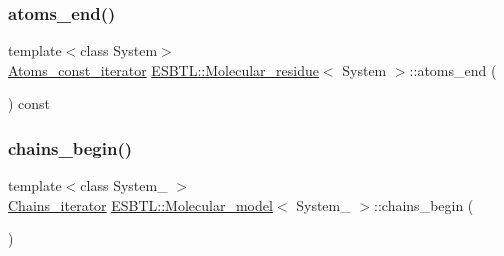 \mbox{\label{group__grp__iters_ga27d17ddd3a3c208e95464afb2e466459}} 
\subsubsection{\texorpdfstring{atoms\+\_\+end()}{atoms\_end()}\hspace{0.1cm}{\footnotesize\ttfamily [8/8]}}
{\footnotesize\ttfamily template$<$class System$>$ \\
\hyperlink{group__grp__iters_gab312d7a420670665b99a379b51825c9c}{Atoms\+\_\+const\+\_\+iterator} \hyperlink{classESBTL_1_1Molecular__residue}{E\+S\+B\+T\+L\+::\+Molecular\+\_\+residue}$<$ System $>$\+::atoms\+\_\+end (\begin{DoxyParamCaption}{ }\end{DoxyParamCaption}) const\hspace{0.3cm}{\ttfamily [inline]}}

\mbox{\label{group__grp__iters_gaab272442c99d33d2f421a632fcee1569}} 
\subsubsection{\texorpdfstring{chains\+\_\+begin()}{chains\_begin()}\hspace{0.1cm}{\footnotesize\ttfamily [1/2]}}
{\footnotesize\ttfamily template$<$class System\+\_\+ $>$ \\
\hyperlink{group__grp__iters_ga763cc293a5df9ae7dd6e31c198dce24b}{Chains\+\_\+iterator} \hyperlink{classESBTL_1_1Molecular__model}{E\+S\+B\+T\+L\+::\+Molecular\+\_\+model}$<$ System\+\_\+ $>$\+::chains\+\_\+begin (\begin{DoxyParamCaption}{ }\end{DoxyParamCaption})\hspace{0.3cm}{\ttfamily [inline]}}

\mbox{\label{group__grp__iters_ga50ff1b2b5446b4978ff4269732f6ae06}} 
